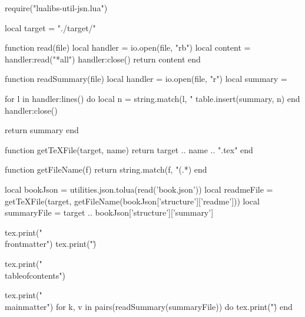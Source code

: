 \documentclass[10pt, a4, oneside]{ltjsbook}
\begin{document}
\begin{luacode*}
  require("lualibs-util-jsn.lua")

  local target = "./target/"

  function read(file)
    local handler = io.open(file, "rb")
    local content = handler:read("*all")
    handler:close()
    return content
  end

  function readSummary(file)
    local handler = io.open(file, "r")
    local summary = {}

    for l in handler:lines() do
      local n = string.match(l, "%
      table.insert(summary, n)
    end
    handler:close()

    return summary
  end

  function getTeXFile(target, name)
    return target .. name .. ".tex"
  end

  function getFileName(f)
    return string.match(f, "(.*)%
  end

  local bookJson = utilities.json.tolua(read('book.json'))
  local readmeFile  = getTeXFile(target, getFileName(bookJson['structure']['readme']))
  local summaryFile = target .. bookJson['structure']['summary']

  tex.print("\\frontmatter")
  tex.print("\")

  tex.print("\\tableofcontents")

  tex.print("\\mainmatter")
  for k, v in pairs(readSummary(summaryFile)) do
    tex.print("\")
  end
\end{luacode*}
\end{document}
